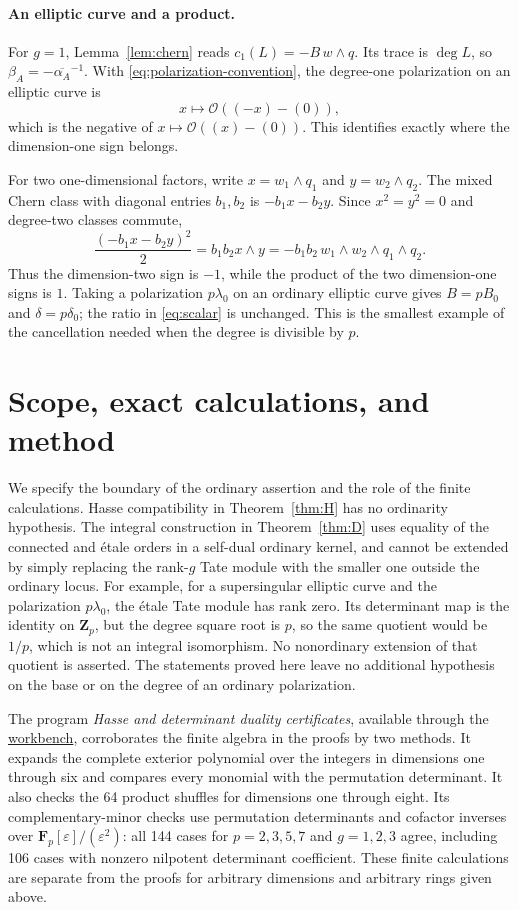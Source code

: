 \documentclass[11pt]{article}
\theoremstyle{definition}\newtheorem{definition}[theorem]{Definition}
\theoremstyle{remark}\newtheorem{remark}[theorem]{Remark}
\newcommand{\OO}{\mathcal O}
\newcommand{\ZZ}{\mathbf Z}
\newcommand{\FF}{\mathbf F}
\newcommand{\workbenchurl}{https://github.com/KokunoYumeto/schemes-and-moduli-workbench}
\begin{document}
\paragraph{An elliptic curve and a product.}
For $g=1$, Lemma~\ref{lem:chern} reads $c_1(L)=-B\,w\wedge q$. Its trace is $\deg L$, so $\beta_A=-\overline{\alpha_A}^{-1}$. With \eqref{eq:polarization-convention}, the degree-one polarization on an elliptic curve is
\[
 x\longmapsto\OO((-x)-(0)),
\]
which is the negative of $x\mapsto\OO((x)-(0))$. This identifies exactly where the dimension-one sign belongs.

For two one-dimensional factors, write $x=w_1\wedge q_1$ and $y=w_2\wedge q_2$. The mixed Chern class with diagonal entries $b_1,b_2$ is $-b_1x-b_2y$. Since $x^2=y^2=0$ and degree-two classes commute,
\[
 \frac{(-b_1x-b_2y)^2}{2}=b_1b_2x\wedge y
 =-b_1b_2\,w_1\wedge w_2\wedge q_1\wedge q_2.
\]
Thus the dimension-two sign is $-1$, while the product of the two dimension-one signs is $1$. Taking a polarization $p\lambda_0$ on an ordinary elliptic curve gives $B=pB_0$ and $\delta=p\delta_0$; the ratio in \eqref{eq:scalar} is unchanged. This is the smallest example of the cancellation needed when the degree is divisible by $p$.

\section{Scope, exact calculations, and method}\label{sec:scope}

We specify the boundary of the ordinary assertion and the role of the finite calculations. Hasse compatibility in Theorem~\ref{thm:H} has no ordinarity hypothesis. The integral construction in Theorem~\ref{thm:D} uses equality of the connected and \'etale orders in a self-dual ordinary kernel, and cannot be extended by simply replacing the rank-$g$ Tate module with the smaller one outside the ordinary locus. For example, for a supersingular elliptic curve and the polarization $p\lambda_0$, the \'etale Tate module has rank zero. Its determinant map is the identity on $\ZZ_p$, but the degree square root is $p$, so the same quotient would be $1/p$, which is not an integral isomorphism. No nonordinary extension of that quotient is asserted. The statements proved here leave no additional hypothesis on the base or on the degree of an ordinary polarization.

The program \emph{Hasse and determinant duality certificates}, available through the \href{\workbenchurl}{workbench}, corroborates the finite algebra in the proofs by two methods. It expands the complete exterior polynomial over the integers in dimensions one through six and compares every monomial with the permutation determinant. It also checks the 64 product shuffles for dimensions one through eight. Its complementary-minor checks use permutation determinants and cofactor inverses over $\FF_p[\varepsilon]/(\varepsilon^2)$: all 144 cases for $p=2,3,5,7$ and $g=1,2,3$ agree, including 106 cases with nonzero nilpotent determinant coefficient. These finite calculations are separate from the proofs for arbitrary dimensions and arbitrary rings given above.
\end{document}
